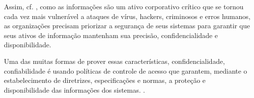 Assim, cf. , como as informações são um ativo corporativo crítico que se tornou cada vez mais vulnerável a ataques de vírus, hackers, criminosos e erros humanos, as organizações precisam priorizar a segurança de seus sistemas para garantir que seus ativos de informação mantenham sua precisão, confidencialidade e disponibilidade. 

Uma das muitas formas de prover essas características, confidencialidade, confiabilidade é usando políticas de controle de acesso que garantem, mediante o estabelecimento de diretrizes, especificações e normas, a proteção e disponibilidade das informações dos sistemas. \cite{bellettini_role_2001} \cite{ueda_tese_2012}.







